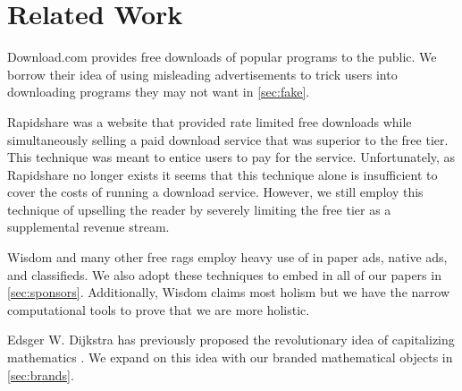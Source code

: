 \section{Related Work}
\label{sec:related}

Download.com \cite{download-com} provides free downloads of popular programs to
the public.
We borrow their idea of using misleading advertisements to trick users into
downloading programs they may not want in \autoref{sec:fake}.

Rapidshare \cite{rapidshare} was a website that provided rate limited free
downloads while simultaneously selling a paid download service that was
superior to the free tier.
This technique was meant to entice users to pay for the service.
Unfortunately, as Rapidshare no longer exists it seems that this technique
alone is insufficient to cover the costs of running a download service.
However, we still employ this technique of upselling the reader by severely
limiting the free tier as a supplemental revenue stream.

Wisdom \cite{wisdom} and many other free rags employ heavy use of in paper ads,
native ads, and classifieds.
We also adopt these techniques to embed in all of our papers in
\autoref{sec:sponsors}.
Additionally, Wisdom claims most holism but we have the narrow computational
tools to prove that we are more holistic.

Edsger W. Dijkstra has previously proposed the revolutionary idea of
capitalizing mathematics \cite{cap-math}.
We expand on this idea with our branded mathematical objects in
\autoref{sec:brands}.
